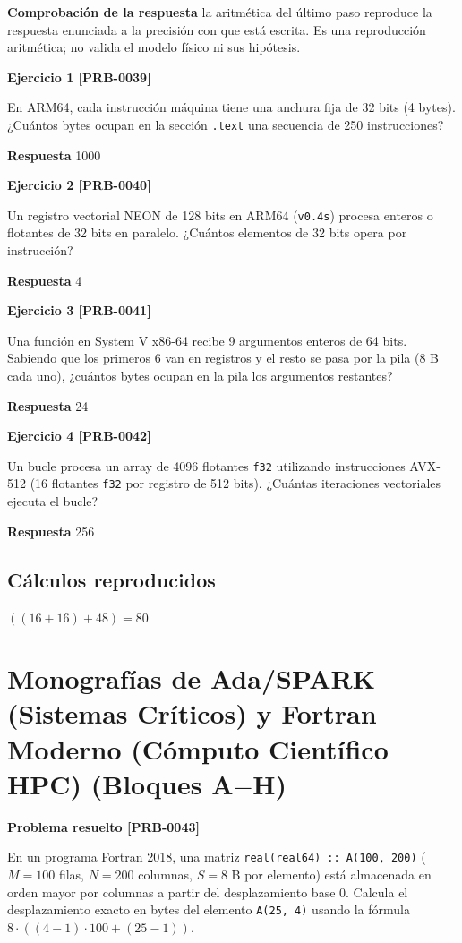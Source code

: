 \documentclass{book}
\begin{document}
\noindent\textbf{Comprobación de la respuesta} la aritmética del último paso reproduce la respuesta enunciada a la precisión con que está escrita. Es una reproducción aritmética; no valida el modelo físico ni sus hipótesis.

\noindent\textbf{Ejercicio 1 [PRB-0039]}

En ARM64, cada instrucción máquina tiene una anchura fija de 32 bits (4 bytes). ¿Cuántos bytes ocupan en la sección \texttt{.text} una secuencia de 250 instrucciones?

\noindent\textbf{Respuesta} 1000

\noindent\textbf{Ejercicio 2 [PRB-0040]}

Un registro vectorial NEON de 128 bits en ARM64 (\texttt{v0.4s}) procesa enteros o flotantes de 32 bits en paralelo. ¿Cuántos elementos de 32 bits opera por instrucción?

\noindent\textbf{Respuesta} 4

\noindent\textbf{Ejercicio 3 [PRB-0041]}

Una función en System V x86-64 recibe 9 argumentos enteros de 64 bits. Sabiendo que los primeros 6 van en registros y el resto se pasa por la pila (8 B cada uno), ¿cuántos bytes ocupan en la pila los argumentos restantes?

\noindent\textbf{Respuesta} 24

\noindent\textbf{Ejercicio 4 [PRB-0042]}

Un bucle procesa un array de 4096 flotantes \texttt{f32} utilizando instrucciones AVX-512 (16 flotantes \texttt{f32} por registro de 512 bits). ¿Cuántas iteraciones vectoriales ejecuta el bucle?

\noindent\textbf{Respuesta} 256

\subsection*{Cálculos reproducidos}

\(\left(\left(16+16\right)+48\right) = 80\)

\section{Monografías de Ada/SPARK (Sistemas Críticos) y Fortran Moderno (Cómputo Científico HPC) (Bloques A\(-\)H)}

\noindent\textbf{Problema resuelto [PRB-0043]}

En un programa Fortran 2018, una matriz \texttt{real(real64) :: A(100, 200)} (\(M = 100\) filas, \(N = 200\) columnas, \(S = 8\text{ B}\) por elemento) está almacenada en orden mayor por columnas a partir del desplazamiento base \(0\). Calcula el desplazamiento exacto en bytes del elemento \texttt{A(25, 4)} usando la fórmula \(8 \cdot ((4 - 1) \cdot 100 + (25 - 1))\).
\end{document}
